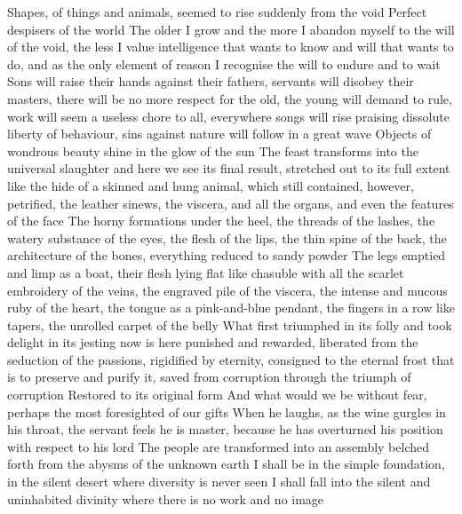 \documentclass{article}
\begin{document}
Shapes, of things and animals, seemed to rise suddenly from the void
Perfect despisers of the world
The older I grow and the more I abandon myself to the will of the void, the less I value intelligence that wants to know and will that wants to do, and as the only element of reason I recognise the will to endure and to wait
Sons will raise their hands against their fathers, servants will disobey their masters, there will be no more respect for the old, the young will demand to rule, work will seem a useless chore to all, everywhere songs will rise praising dissolute liberty of behaviour, sins against nature will follow in a great wave
Objects of wondrous beauty shine in the glow of the sun
The feast transforms into the universal slaughter and here we see its final result, stretched out to its full extent like the hide of a skinned and hung animal, which still contained, however, petrified, the leather sinews, the viscera, and all the organs, and even the features of the face
The horny formations under the heel, the threads of the lashes, the watery substance of the eyes, the flesh of the lips, the thin spine of the back, the architecture of the bones, everything reduced to sandy powder
The legs emptied and limp as a boat, their flesh lying flat like chasuble with all the scarlet embroidery of the veins, the engraved pile of the viscera, the intense and mucous ruby of the heart, the tongue as a pink-and-blue pendant, the fingers in a row like tapers, the unrolled carpet of the belly
What first triumphed in its folly and took delight in its jesting now is here punished and rewarded, liberated from the seduction of the passions, rigidified by eternity, consigned to the eternal frost that is to preserve and purify it, saved from corruption through the triumph of corruption
Restored to its original form
And what would we be without fear, perhaps the most foresighted of our gifts
When he laughs, as the wine gurgles in his throat, the servant feels he is master, because he has overturned his position with respect to his lord
The people are transformed into an assembly belched forth from the abysms of the unknown earth
I shall be in the simple foundation, in the silent desert where diversity is never seen
I shall fall into the silent and uninhabited divinity where there is no work and no image
\fi
\end{document}
